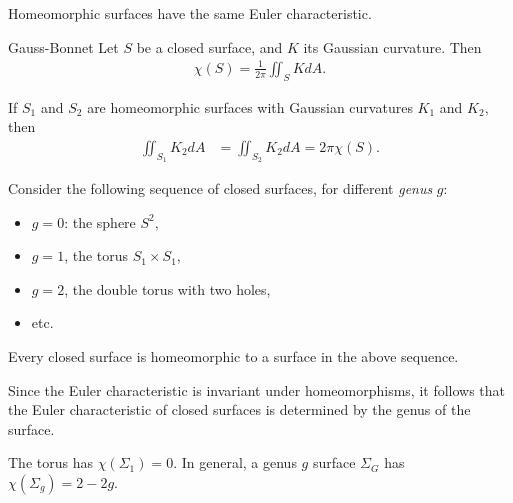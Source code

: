 \begin{thm}
    Homeomorphic surfaces have the same Euler characteristic.
\end{thm}

\begin{thm}{Gauss-Bonnet}\proofbreak
    Let $S$ be a closed surface, and $K$ its Gaussian curvature. Then
    \begin{align*}
        \chi(S) = \frac{1}{2\pi}\iint_{S}KdA.
    \end{align*}
\end{thm}

\begin{cor}
    If $S_1$ and $S_2$ are homeomorphic surfaces with Gaussian curvatures $K_1$ and $K_2$, then
    \begin{align*}
        \iint_{S_1}K_2dA &= \iint_{S_2}K_2dA = 2\pi \chi(S).
    \end{align*}
\end{cor}

\begin{exmp}
    Consider the following sequence of closed surfaces, for different \emph{genus} $g$:
    \begin{itemize}
        \item $g = 0$: the sphere $S^2$,
        \item $g = 1$, the torus $S_1 \times S_1$,
        \item $g=2$, the double torus with two holes,
        \item etc.
    \end{itemize}
\end{exmp}

\begin{thm}
    Every closed surface is homeomorphic to a surface in the above sequence.
\end{thm}

\begin{rmk}
    Since the Euler characteristic is invariant under homeomorphisms, it follows that the Euler characteristic of closed surfaces is determined by the genus of the surface.
\end{rmk}

\begin{prop}
    The torus has $\chi(\Sigma_1) = 0$. In general, a genus $g$ surface $\Sigma_G$ has $\chi(\Sigma_g) = 2 - 2g$.
\end{prop}

